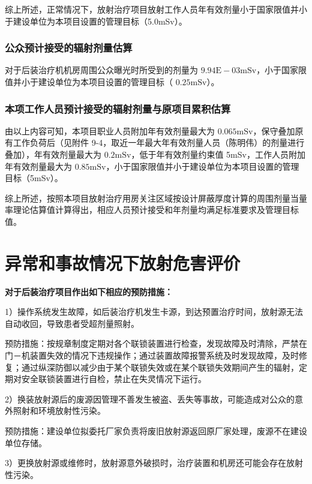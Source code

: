 综上所述，正常情况下，放射治疗项目放射工作人员年有效剂量小于国家限值并小于建设单位为本项目设置的管理目标（5.0mSv）。

\subsubsection{公众预计接受的辐射剂量估算}

对于后装治疗机机房周围公众曝光时所受到的剂量为 $9 . 9 4 \mathrm { E } { - } 0 3 \mathrm { m S v }$，小于国家限值并小于建设单位为本项目设置的管理目标（ $0 . 2 5 \mathrm { m S v }$）。

\subsubsection{本项工作人员预计接受的辐射剂量与原项目累积估算}

由以上内容可知，本项目职业人员附加年有效剂量最大为 $0 . 0 6 5 \mathrm { m S v }$，保守叠加原有工作负荷后（见附件 9-4，取近一年最大年有效剂量人员（陈明伟）的剂量进行叠加），年有效剂量最大为 $0 . 2 \mathrm { m S v }$，低于年有效剂量约束值 5mSv，工作人员附加年有效剂量最大为 $0 . 8 5 \mathrm { m S v }$，小于国家限值并小于建设单位为本项目设置的管理目标（5mSv）。

综上所述，按照本项目放射治疗用房关注区域按设计屏蔽厚度计算的周围剂量当量率理论估算值计算得出，相应人员预计接受和年剂量均满足标准要求及管理目标值。

\section{异常和事故情况下放射危害评价}

\textbf{对于后装治疗项目作出如下相应的预防措施：}

1）操作系统发生故障，如后装治疗机发生卡源，到达预置治疗时间，放射源无法自动收回，导致患者受超剂量照射。

预防措施：按规章制度定期对各个联锁装置进行检查，发现故障及时清除，严禁在门－机装置失效的情况下违规操作；通过装置故障报警系统及时发现故障，及时修复；通过纵深防御以减少由于某个联锁失效或在某个联锁失效期间产生的辐射，定期对安全联锁装置进行自检，禁止在失灵情况下运行。

2）换装放射源后的废源因管理不善发生被盗、丢失等事故，可能造成对公众的意外照射和环境放射性污染。

预防措施：建设单位拟委托厂家负责将废旧放射源返回原厂家处理，废源不在建设单位存储。

3）更换放射源或维修时，放射源意外破损时，治疗装置和机房还可能会存在放射性污染。

